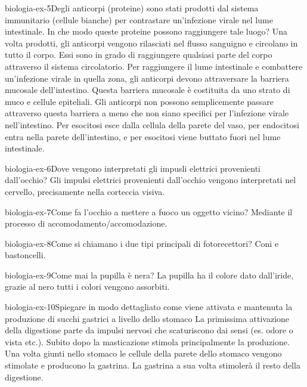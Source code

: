 \documentclass[preview]{standalone}
\begin{document}
\begin{snippetexercise}{biologia-ex-5}{Degli anticorpi (proteine) sono stati prodotti dal sistema immunitario (cellule bianche) per contrastare un'infezione virale nel lume intestinale. In che modo queste proteine possono raggiungere tale luogo?}
    Una volta prodotti, gli anticorpi vengono rilasciati nel flusso sanguigno e circolano in tutto il corpo. Essi sono in grado di raggiungere qualsiasi parte del corpo attraverso il sistema circolatorio.
    Per raggiungere il lume intestinale e combattere un'infezione virale in quella zona, gli anticorpi devono attraversare la barriera mucosale dell'intestino. Questa barriera mucosale è costituita da uno strato di muco e cellule epiteliali. Gli anticorpi non possono semplicemente passare attraverso questa barriera a meno che non siano specifici per l'infezione virale nell'intestino.
    Per esocitosi esce dalla cellula della parete del vaso, per endocitosi entra nella parete dell'intestino, e per esocitosi viene buttato fuori nel lume intestinale.
\end{snippetexercise}

\begin{snippetexercise}{biologia-ex-6}{Dove vengono interpretati gli impusli elettrici provenienti dall'occhio?}
    Gli impulsi elettrici provenienti dall'occhio vengono interpretati nel cervello, precisamente nella corteccia visiva.
\end{snippetexercise}

\begin{snippetexercise}{biologia-ex-7}{Come fa l'occhio a mettere a fuoco un oggetto vicino?}
    Mediante il processo di accomodamento/accomodazione.
\end{snippetexercise}

\begin{snippetexercise}{biologia-ex-8}{Come si chiamano i due tipi principali di fotorecettori?}
    Coni e bastoncelli.
\end{snippetexercise}

\begin{snippetexercise}{biologia-ex-9}{Come mai la pupilla è nera?}
    La pupilla ha il colore dato dall'iride,
    grazie al nero tutti i colori vengono assorbiti.
\end{snippetexercise}

\begin{snippetexercise}{biologia-ex-10}{Spiegare in modo dettagliato come viene attivata e mantenuta la produzione di succhi gastrici a
    livello dello stomaco}
    La primissima attivazione della digestione parte da impulsi nervosi che scaturiscono dai sensi
    (es. odore o vista etc.).
    Subito dopo la masticazione stimola principalmente la produzione.
    Una volta giunti nello stomaco le cellule della parete dello stomaco vengono stimolate e producono la gastrina.
    La gastrina a sua volta stimolerà il resto della digestione.
\end{snippetexercise}
\end{document}
